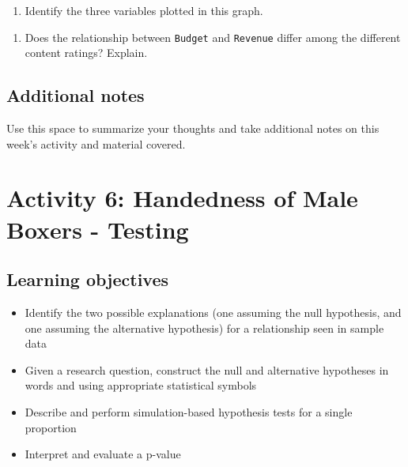 \documentclass[
]{report}
\providecommand{\tightlist}{%
  \setlength{\itemsep}{0pt}\setlength{\parskip}{0pt}}
\begin{document}
\begin{enumerate}
\def\labelenumi{\arabic{enumi}.}
\setcounter{enumi}{3}
\tightlist
\item
  Identify the three variables plotted in this graph.
\end{enumerate}

\vspace{0.5in}

\begin{enumerate}
\def\labelenumi{\arabic{enumi}.}
\setcounter{enumi}{4}
\tightlist
\item
  Does the relationship between \texttt{Budget} and \texttt{Revenue} differ among the different content ratings? Explain.
\end{enumerate}

\vspace{1in}

\newpage

\hypertarget{additional-notes}{%
\section{Additional notes}\label{additional-notes}}

Use this space to summarize your thoughts and take additional notes on this week's activity and material covered.

\hypertarget{activity-6-handedness-of-male-boxers---testing}{%
\chapter{Activity 6: Handedness of Male Boxers - Testing}\label{activity-6-handedness-of-male-boxers---testing}}

\hypertarget{learning-objectives}{%
\section{Learning objectives}\label{learning-objectives}}

\begin{itemize}
\item
  Identify the two possible explanations (one assuming the null hypothesis, and one assuming the alternative hypothesis) for a relationship seen in sample data
\item
  Given a research question, construct the null and alternative hypotheses
  in words and using appropriate statistical symbols
\item
  Describe and perform simulation-based hypothesis tests for a single proportion
\item
  Interpret and evaluate a p-value
\end{itemize}
\end{document}
